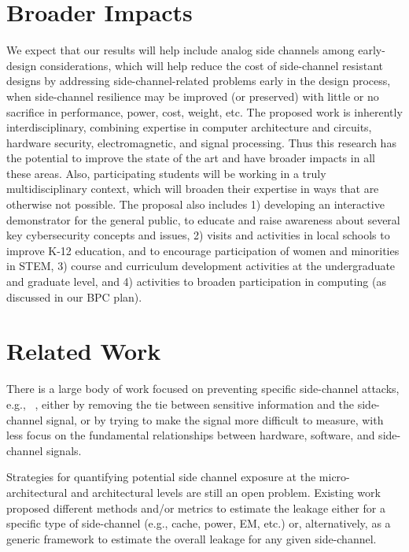 \documentclass[11 pt]{article}
\begin{document}
\section{Broader Impacts}
We expect that our results will help include analog side channels among early-design considerations, which will help reduce the cost of side-channel resistant designs by addressing side-channel-related problems early in the design process, when side-channel resilience may be improved (or preserved) with little or no sacrifice in performance, power, cost, weight, etc. The proposed work is inherently interdisciplinary, combining expertise in computer architecture and circuits, hardware security, electromagnetic, and signal processing. Thus this research has the potential to improve the state of the art and have broader impacts in all these areas. Also, participating students will be working in a truly multidisciplinary context, which will broaden their expertise in ways that are otherwise not possible. The proposal also includes 1) developing an interactive demonstrator for the general public, to educate and raise awareness about several key cybersecurity concepts and issues, 2) visits and activities in local schools to improve K-12 education, and to  encourage participation of women and minorities in STEM, 3) course and curriculum development activities at the undergraduate and graduate level, and 4) activities to broaden participation in computing (as discussed in our BPC plan).
\section{Related Work}
There is a large body of work focused on preventing specific side-channel attacks, e.g., ~\cite{Backes:2010:ASA:1929820.1929847,Nazari:2017:EED:3079856.3080223,Demme:2013:FOM:2485922.2485970,Han:2017:WMB:3133956.3134081,Liu:2016:CET:2976749.2978299,6987331,He:2017:SYC:3123939.3124546,217605,Monjur21}, either by removing the tie between sensitive information and the side-channel signal, or by
trying to make the signal more difficult to measure, with less focus on the fundamental relationships between hardware, software, and side-channel signals.

Strategies for quantifying potential side channel exposure at the micro-architectural and architectural levels are still
an open problem. Existing work proposed different methods and/or metrics to estimate the leakage either for a specific type of side-channel (e.g., cache, power, EM, etc.) or, alternatively, as a generic framework to estimate the overall leakage for any given side-channel.
\end{document}
